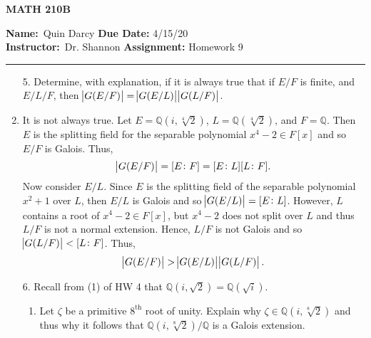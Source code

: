 \documentclass[12pt]{article}
\makeatletter
\theoremstyle{definition}
\theoremstyle{remark}
\newenvironment{solution}[1][\bf{\textit{Solution}}]{\par
  
  \normalfont \topsep6\p@\@plus6\p@\relax
  \list{}{\leftmargin=0mm
          \rightmargin=4mm
          \settowidth{\itemindent}{\itshape#1}%
          \labelwidth=\itemindent
          \parsep=0pt \listparindent=\parindent 
  }
  \item[\hskip\labelsep
        \itshape
    #1\@addpunct{.}]\ignorespaces
}{%
  \popQED\endlist\@endpefalse
}
\makeatother
\begin{document}
\thispagestyle{empty}\hline

\begin{center}
	\vspace{.4cm} {\textbf { \large MATH 210B}}
\end{center}
{\textbf{Name:}\ Quin Darcy \hspace{\fill} \textbf{Due Date:} 4/15/20   \\
{ \textbf{Instructor:}}\ Dr. Shannon \hspace{\fill} \textbf{Assignment:} Homework 9 \\ \hrule}

\justifying

    \begin{enumerate}[leftmargin=*]
        \item[5.] Determine, with explanation, if it is always true that if $E/F$ is finite, and $E/L/F$, then $\abs{G(E/F)}=\abs{G(E/L)}\abs{G(L/F)}$.
            \begin{solution}
                It is not always true. Let $E=\mathbb{Q}(i,\sqrt[4]{2})$, $L=\mathbb{Q}(\sqrt[4]{2})$, and $F=\mathbb{Q}$. Then $E$ is the splitting field for the separable polynomial $x^4-2\in F[x]$ and so $E/F$ is Galois. Thus,
                    \begin{equation*}
                        \abs{G(E/F)}=[E\colon F]=[E\colon L][L\colon F].
                    \end{equation*}
                Now consider $E/L$. Since $E$ is the splitting field of the separable polynomial $x^2+1$ over $L$, then $E/L$ is Galois and so $\abs{G(E/L)}=[E\colon L]$. However, $L$ contains a root of $x^4-2\in F[x]$, but $x^4-2$ does not split over $L$ and thus $L/F$ is not a normal extension. Hence, $L/F$ is not Galois and so $\abs{G(L/F)}<[L\colon F]$. Thus, 
                    \begin{equation*}
                        \abs{G(E/F)}>\abs{G(E/L)}\abs{G(L/F)}.
                    \end{equation*}
            \end{solution}
        \item[6.] Recall from (1) of HW 4 that $\mathbb{Q}(i,\sqrt{2})=\mathbb{Q}(\sqrt{i})$.
            \begin{enumerate}[label=(\alph*)]
                \item Let $\zeta$ be a primitive $8^{\text{th}}$ root of unity. Explain why $\zeta\in\mathbb{Q}(i,\sqrt[8]{2})$ and thus why it follows that $\mathbb{Q}(i,\sqrt[8]{2})/\mathbb{Q}$ is a Galois extension.

\end{enumerate}
\end{enumerate}
\end{document}

